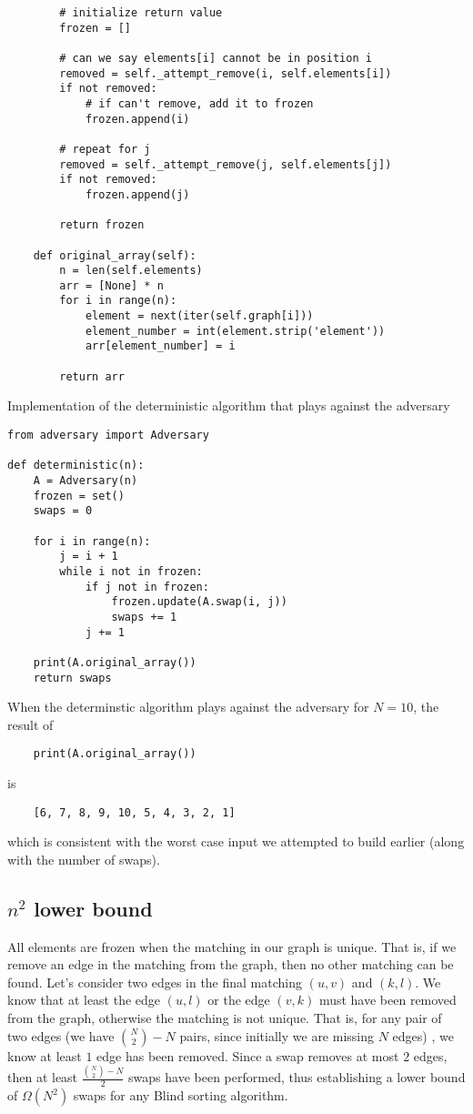\documentclass{article}
\begin{document}
\begin{verbatim}
        # initialize return value
        frozen = []

        # can we say elements[i] cannot be in position i
        removed = self._attempt_remove(i, self.elements[i])
        if not removed:
            # if can't remove, add it to frozen
            frozen.append(i)

        # repeat for j
        removed = self._attempt_remove(j, self.elements[j])
        if not removed:
            frozen.append(j)

        return frozen

    def original_array(self):
        n = len(self.elements)
        arr = [None] * n
        for i in range(n):
            element = next(iter(self.graph[i]))
            element_number = int(element.strip('element'))
            arr[element_number] = i

        return arr
\end{verbatim}

Implementation of the deterministic algorithm that plays against the adversary
\begin{verbatim}
from adversary import Adversary

def deterministic(n):
    A = Adversary(n)
    frozen = set()
    swaps = 0

    for i in range(n):
        j = i + 1
        while i not in frozen:
            if j not in frozen:
                frozen.update(A.swap(i, j))
                swaps += 1
            j += 1

    print(A.original_array())
    return swaps
\end{verbatim}

When the determinstic algorithm plays against the adversary for $N = 10$, the result of 
\begin{verbatim}
    print(A.original_array())
\end{verbatim}
is
\begin{verbatim}
    [6, 7, 8, 9, 10, 5, 4, 3, 2, 1]
\end{verbatim}
which is consistent with the worst case input we attempted to build earlier (along with the number of swaps).

\subsection{$n^2$ lower bound}
All elements are frozen when the matching in our graph is unique. That is, if we remove an edge
in the matching from the graph, then no other matching can be found. Let's consider two edges in the final
matching $(u, v)$ and $(k, l)$. We know that at least the edge $(u, l)$ or the edge $(v, k)$ must have been removed
from the graph, otherwise the matching is not unique. That is, for any pair of two edges (we have ${N \choose 2} - N$ pairs, since initially we are missing $N$ edges)
, we know at least $1$ edge has been removed. Since a swap removes at most $2$ edges, then at least $\frac{{N \choose 2} - N}{2}$ swaps have been performed,
thus establishing a lower bound of $\Omega(N^2)$ swaps for any Blind sorting algorithm.
\end{document}
